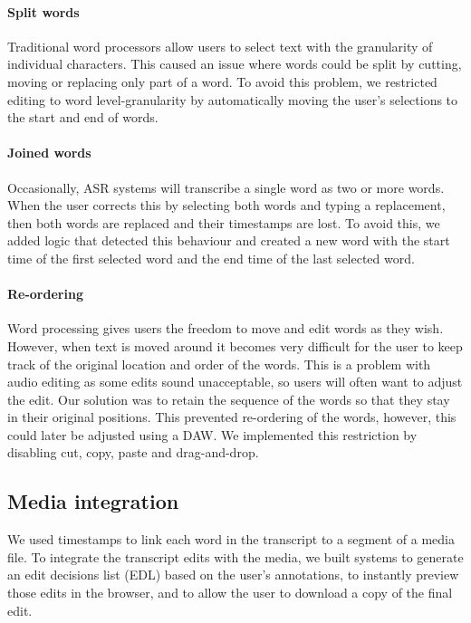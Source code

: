 \paragraph{Split words}
Traditional word processors allow users to select text with the granularity of individual characters. This caused an
issue where words could be split by cutting, moving or replacing only part of a word. To avoid this problem, we
restricted editing to word level-granularity by automatically moving the user's selections to the start and end of
words.

\paragraph{Joined words}
Occasionally, ASR systems will transcribe a single word as two or more words. When the user corrects this by selecting
both words and typing a replacement, then both words are replaced and their timestamps are lost. To avoid this, we
added logic that detected this behaviour and created a new word with the start time of the first selected word and the end time
of the last selected word.

\paragraph{Re-ordering}
Word processing gives users the freedom to move and edit words as they wish.  However, when text is moved around it becomes
very difficult for the user to keep track of the original location and order of the words. This is a problem with audio
editing as some edits sound unacceptable, so users will often want to adjust the edit.
Our solution was to retain the sequence of the words so that they stay in their original positions. This prevented
re-ordering of the words, however, this could later be adjusted using a DAW.  We implemented this restriction by disabling cut,
copy, paste and drag-and-drop.

\subsection{Media integration}

We used timestamps to link each word in the transcript to a segment of a media file.  To integrate the transcript edits
with the media, we built systems to generate an edit decisions list (EDL) based on the user's annotations, to instantly
preview those edits in the browser, and to allow the user to download a copy of the final edit.


